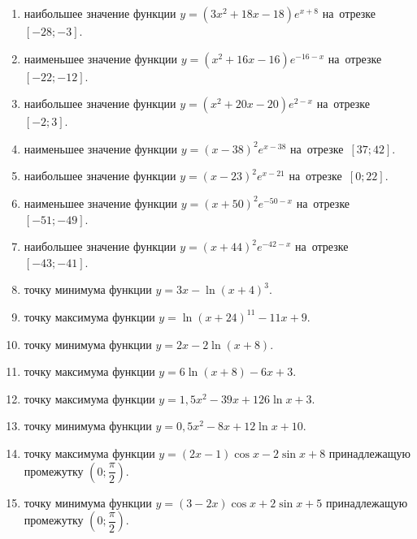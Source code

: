 \documentclass[a4paper,10pt]{article}
\begin{document}
\begin{enumerate}
\item {} наибольшее значение функции $y=\left(3x^2 +18x -18\right)e^{x+8}$ на~отрезке~$\left[-28;-3\right]$.

\item {} наименьшее значение функции $y=\left(x^2 +16x -16\right)e^{-16-x}$ на~отрезке~$\left[-22;-12\right]$.

\item {} наибольшее значение функции $y=\left(x^2 +20x -20\right)e^{2-x}$ на~отрезке~$\left[-2;3\right]$.

\item {} наименьшее значение функции $y=\left(x-38\right)^2e^{x-38}$ на~отрезке~$\left[37;42\right]$.

\item {} наибольшее значение функции $y=\left(x-23\right)^2e^{x-21}$ на~отрезке~$\left[0;22\right]$.

\item {} наименьшее значение функции $y=\left(x+50\right)^2e^{-50-x}$ на~отрезке~$\left[-51;-49\right]$.

\item {} наибольшее значение функции $y=\left(x+44\right)^2e^{-42-x}$ на~отрезке~$\left[-43;-41\right]$.

\item {} точку минимума функции $y=3x-\ln\left(x+4\right)^{3}$.

\item {} точку максимума функции $y=\ln\left(x+24\right)^{11}-11x+9$.

\item {} точку минимума функции $y=2x-2\ln\left(x+8\right)$.

\item {} точку максимума функции $y=6\ln\left(x+8\right)-6x+3$.

\item {} точку максимума функции $y=1,5x^2-39x+126\ln x +3$.

\item {} точку минимума функции $y=0,5x^2-8x+12\ln x +10$.

\item {} точку максимума функции $y=\left(2x-1\right)\cos x -2\sin x+8$
принадлежащую промежутку $\left(0;\dfrac{\pi}{2}\right)$.

\item {} точку минимума функции $y=\left(3-2x\right)\cos x +2\sin x+5$
принадлежащую промежутку $\left(0;\dfrac{\pi}{2}\right)$.


\end{enumerate}
\end{document}

